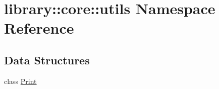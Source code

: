 \hypertarget{namespacelibrary_1_1core_1_1utils}{}\section{library\+:\+:core\+:\+:utils Namespace Reference}
\label{namespacelibrary_1_1core_1_1utils}
\subsection*{Data Structures}
\begin{DoxyCompactItemize}
\item 
class \hyperlink{classlibrary_1_1core_1_1utils_1_1Print}{Print}
\end{DoxyCompactItemize}
